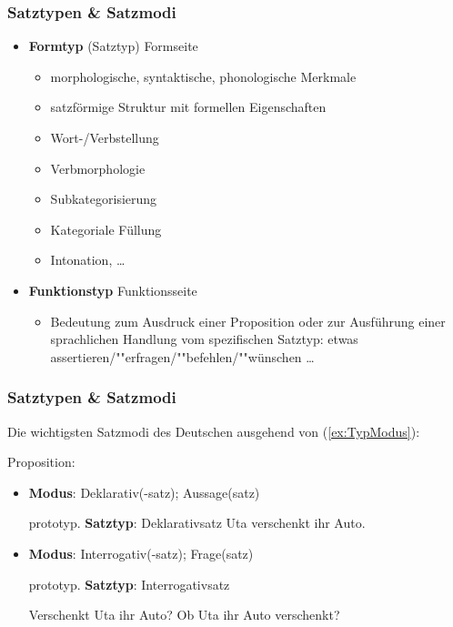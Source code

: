 \begin{frame}
\frametitle{Satztypen \& Satzmodi}

\begin{itemize}
	\item \textbf{Formtyp} (Satztyp) \ras Formseite
	\begin{itemize}
		\item morphologische, syntaktische, phonologische Merkmale
		\item satzförmige Struktur mit formellen Eigenschaften
		\item Wort-/Verbstellung
		\item Verbmorphologie
		\item Subkategorisierung
		\item Kategoriale Füllung
		\item Intonation, \dots
	\end{itemize}

	\item \textbf{Funktionstyp} \ras Funktionsseite
	\begin{itemize}
		\item Bedeutung zum Ausdruck einer Proposition oder zur Ausführung einer sprachlichen Handlung vom spezifischen Satztyp: etwas assertieren/""erfragen/""befehlen/""wünschen \dots\ 
	\end{itemize}
\end{itemize}

\end{frame}


\begin{frame}
\frametitle{Satztypen \& Satzmodi}

Die wichtigsten Satzmodi des Deutschen ausgehend von (\ref{ex:TypModus}):

\ea\label{ex:TypModus} Proposition: 
\z

\pause 

\begin{itemize}
	\item \textbf{Modus}: Deklarativ(-satz); Aussage(satz) 
	
	prototyp. \textbf{Satztyp}: Deklarativsatz
	\ea Uta verschenkt ihr Auto.
	\z

\pause 
	
	\item \textbf{Modus}: Interrogativ(-satz); Frage(satz)
	
	prototyp. \textbf{Satztyp}: Interrogativsatz
	
	\ea Verschenkt Uta ihr Auto?
	\ex Ob Uta ihr Auto verschenkt?
	\z
\end{itemize}

\end{frame}


